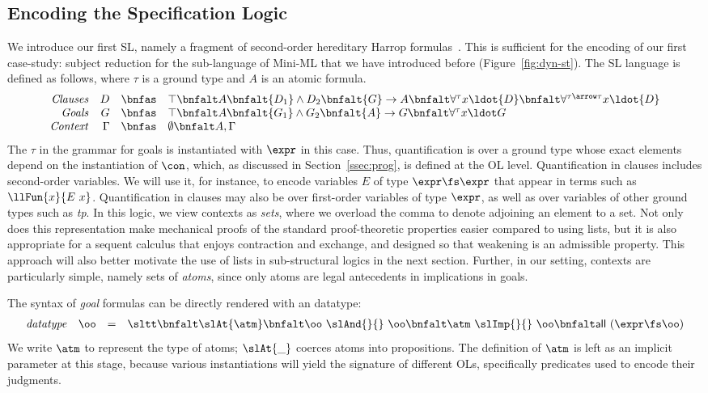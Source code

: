 \documentclass[final]{svjour3}
\begin{document}
\subsection{Encoding the Specification Logic}
\label{ssec:nseq}
We introduce our first SL, namely a fragment of second-order
hereditary Harrop formulas~\cite{Miller91apal}. This is sufficient
for the
encoding of our first case-study: subject reduction for the sub-language of
Mini-ML that we have introduced before (Figure~\ref{fig:dyn-st}).  The
SL language is defined as follows, where $\tau$ is a ground type and
$A$ is an atomic formula.
\[ \begin{array}{rrcl}
 \mbox{\textit{Clauses}} & D & \bnfas & \top\bnfalt A \bnfalt
 {D_1}\land{D_2}\bnfalt
 {G}\to {A}\bnfalt\forall^{\tau} x\ldot{D}\bnfalt
 \forall^{\tau\arrow\tau} x\ldot{D}\\
\mbox{\textit{Goals}} & G & \bnfas & \top\bnfalt A \bnfalt
 {G_1}\land{G_2}\bnfalt
 {A}\to {G}\bnfalt\forall^{\tau} x\ldot G\\
\mbox{\textit{Context}} & \Gamma & \bnfas & \emptyset \bnfalt A,\Gamma
\end{array} \]
The $\tau$ in the grammar for goals is instantiated with $\expr$ in
this case. Thus, quantification is over a ground type whose exact
elements depend on the instantiation of $\con$, which, as discussed in
Section~\ref{ssec:prog}, is defined at the OL level.  Quantification in
clauses includes second-order variables. We will use it, for instance,
to encode variables $E$ of 
type $\expr\fs\expr$ that appear in terms such as $\llFun{x}{E\ x}$.
Quantification in clauses may also be over first-order variables of
type $\expr$, as well as over variables of other ground types such as
\textit{tp}.  In this logic, we view contexts as \emph{sets}, where we
overload the comma to denote adjoining an element to a set.  Not only
does this representation make mechanical proofs of the standard
proof-theoretic properties easier compared to using lists, but it is
also appropriate for a sequent calculus that enjoys contraction and
exchange, and designed so that weakening is an admissible
property. This approach will also better motivate the use of lists in
sub-structural logics in the next section. Further, in our setting,
contexts are particularly simple, namely sets of \emph{atoms}, since
only atoms are legal antecedents in implications in goals.

The syntax of \emph{goal} formulas can be directly rendered with an \HOL 
  datatype:
  \[ \begin{array}{rrcl} \mbox{\textit{datatype}}& \oo & = &
    \sltt\bnfalt\slAt{\atm}\bnfalt \oo\ \slAnd{}{} \ \oo\bnfalt \atm\
    \slImp{}{} \ \oo\bnfalt \mathsf{all}\ (\expr\fs\oo)
  \end{array} \] 
We write $\atm$ to represent the type of atoms;
  $\slAt{ \_ }$ coerces atoms into propositions. The definition of
  $\atm$ is left as an implicit parameter at this stage, because various
  instantiations will yield the signature of different OLs,
  specifically predicates used to encode their judgments.
\end{document}
